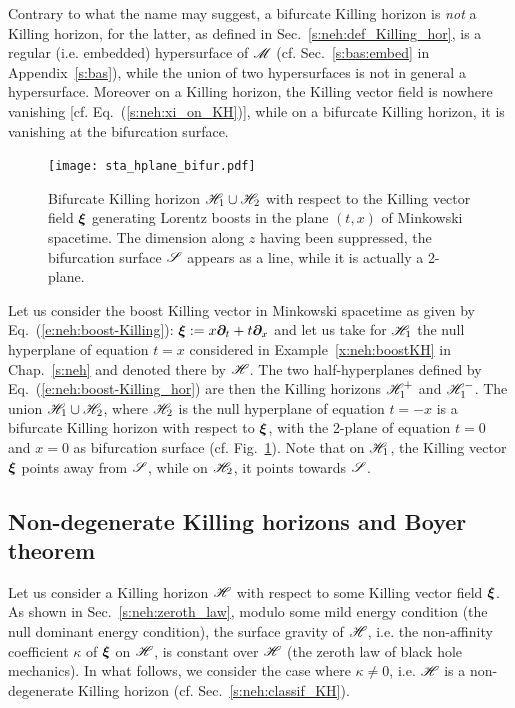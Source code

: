 \begin{remark}
Contrary to what the name may suggest, a bifurcate Killing horizon is \emph{not}
a Killing horizon, for the latter, as defined in Sec.~\ref{s:neh:def_Killing_hor},
is a regular (i.e. embedded) hypersurface
of $\mathscr{M}$ (cf. Sec.~\ref{s:bas:embed} in Appendix~\ref{s:bas}), while
the union of two hypersurfaces is not in general a hypersurface. Moreover
on a Killing horizon, the Killing vector field is nowhere vanishing
[cf. Eq.~(\ref{s:neh:xi_on_KH})], while on
a bifurcate Killing horizon, it is vanishing at the bifurcation surface.
\end{remark}

\begin{figure}
\centerline{\texttt{[image: sta\_hplane\_bifur.pdf]}}
\caption[]{\label{f:sta:hplane_bifur} \footnotesize
Bifurcate Killing horizon $\mathscr{H}_1\cup\mathscr{H}_2$ with respect to the Killing vector
field $\bm{\xi}$ generating Lorentz boosts in the plane $(t,x)$ of Minkowski
spacetime. The dimension along $z$ having been suppressed, the bifurcation
surface $\mathscr{S}$ appears as a line, while it is actually a 2-plane.}
\end{figure}

\begin{example}
\label{x:sta:bif-KH-boost}
Let us consider the boost Killing vector in Minkowski spacetime as given
by Eq.~(\ref{e:neh:boost-Killing}): $\bm{\xi} := x \bm{\partial}_t + t \bm{\partial}_x$
and let us take for $\mathscr{H}_1$ the null hyperplane of equation $t=x$
considered in Example~\ref{x:neh:boostKH} in Chap.~\ref{s:neh} and denoted there
by $\mathscr{H}$. The two half-hyperplanes defined by
Eq.~(\ref{e:neh:boost-Killing_hor}) are then the Killing horizons $\mathscr{H}_1^+$ and
$\mathscr{H}_1^-$. The union $\mathscr{H}_1 \cup \mathscr{H}_2$, where $\mathscr{H}_2$ is the null hyperplane of equation $t=-x$ is a bifurcate Killing horizon with respect to $\bm{\xi}$,
with the 2-plane of equation $t=0$ and $x=0$ as bifurcation surface
(cf. Fig.~\ref{f:sta:hplane_bifur}). Note that on $\mathscr{H}_1$, the Killing vector
$\bm{\xi}$ points away from $\mathscr{S}$, while on $\mathscr{H}_2$, it points towards $\mathscr{S}$.
\end{example}

\subsection{Non-degenerate Killing horizons and Boyer theorem}
\label{s:sta:non-degenerate_KH}

Let us consider a Killing horizon $\mathscr{H}$ with respect to some Killing vector
field $\bm{\xi}$. As shown in Sec.~\ref{s:neh:zeroth_law},
modulo some mild energy condition (the null dominant energy condition),
the surface gravity of $\mathscr{H}$, i.e.
the non-affinity coefficient $\kappa$ of $\bm{\xi}$ on $\mathscr{H}$,
is constant over
$\mathscr{H}$ (the zeroth law of black hole mechanics).
In what follows, we consider the case where $\kappa\not=0$, i.e. $\mathscr{H}$
is a non-degenerate Killing horizon (cf. Sec.~\ref{s:neh:classif_KH}).


